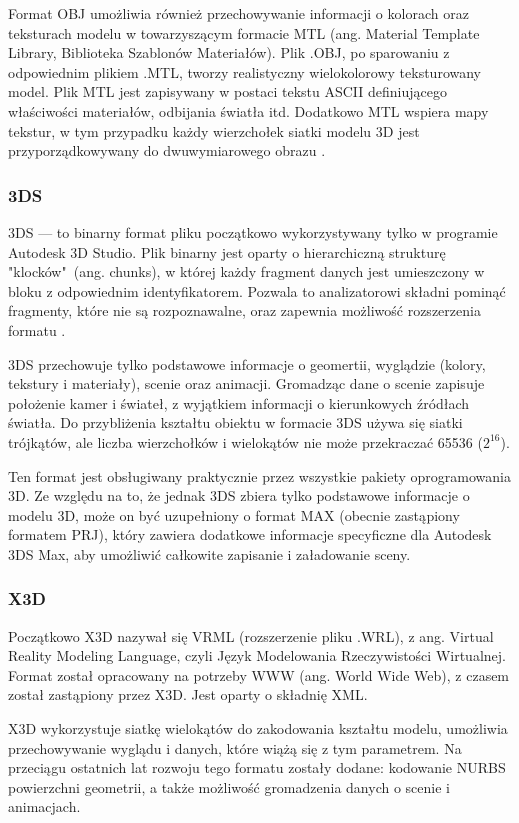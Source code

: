 Format OBJ umożliwia również przechowywanie informacji o kolorach oraz teksturach modelu w towarzyszącym formacie MTL (ang. Material Template Library, Biblioteka Szablonów Materiałów). Plik .OBJ, po sparowaniu z odpowiednim plikiem .MTL, tworzy realistyczny wielokolorowy teksturowany model. Plik MTL jest zapisywany w postaci tekstu ASCII definiującego właściwości materiałów, odbijania światła itd. Dodatkowo MTL wspiera mapy tekstur, w tym przypadku każdy wierzchołek siatki modelu 3D jest przyporządkowywany do dwuwymiarowego obrazu \cite{mtlInfo}. 

\subsubsection{3DS}
3DS --- to binarny format pliku początkowo wykorzystywany tylko w programie Autodesk 3D Studio. Plik binarny jest oparty o hierarchiczną strukturę "klocków"\ (ang. chunks), w której każdy fragment danych jest umieszczony w bloku z odpowiednim identyfikatorem. Pozwala to analizatorowi składni pominąć fragmenty, które nie są rozpoznawalne, oraz zapewnia możliwość rozszerzenia formatu \cite{3dsformat}. 

3DS przechowuje tylko podstawowe informacje o geomertii, wyglądzie (kolory, tekstury i materiały), scenie oraz animacji. Gromadząc dane o scenie zapisuje położenie kamer i świateł, z wyjątkiem informacji o kierunkowych źródłach światła. Do przybliżenia kształtu obiektu w formacie 3DS używa się siatki trójkątów, ale liczba wierzchołków i wielokątów nie może przekraczać 65536 ($2^{16}$). 

Ten format jest obsługiwany praktycznie przez wszystkie pakiety oprogramowania 3D. Ze względu na to, że jednak 3DS zbiera tylko podstawowe informacje o modelu 3D, może on być uzupełniony o format MAX (obecnie zastąpiony formatem PRJ), który zawiera dodatkowe informacje specyficzne dla Autodesk 3DS Max, aby umożliwić całkowite zapisanie i załadowanie sceny.

\subsubsection{X3D}
Początkowo X3D nazywał się VRML (rozszerzenie pliku .WRL), z ang. Virtual Reality Modeling Language, czyli Język Modelowania Rzeczywistości Wirtualnej. Format został opracowany na potrzeby WWW (ang. World Wide Web), z czasem został zastąpiony przez X3D. Jest oparty o składnię XML.

X3D wykorzystuje siatkę wielokątów do zakodowania kształtu modelu, umożliwia przechowywanie wyglądu i danych, które wiążą się z tym parametrem. Na przeciągu ostatnich lat rozwoju tego formatu zostały dodane: kodowanie NURBS powierzchni geometrii, a także możliwość gromadzenia danych o scenie i animacjach.

